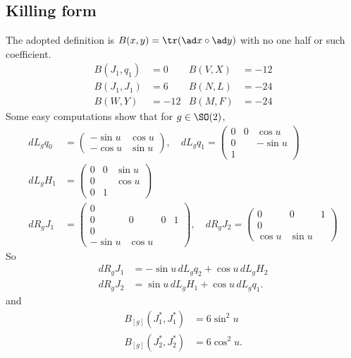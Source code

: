 \subsection{Killing form}
The adopted definition is $B(x,y)=\tr(\ad x\circ\ad y)$ with no one half or such coefficient.
\begin{equation}
	\begin{aligned}
		B(J_1,q_1) & =0   & B(V,X) & =-12 \\
		B(J_1,J_1) & =6   & B(N,L) & =-24 \\
		B(W,Y)     & =-12 & B(M,F) & =-24
	\end{aligned}
\end{equation}
Some easy computations show that for $g\in \SO(2)$,
\[
	\begin{split}
		dL_gq_0  & =
		\begin{pmatrix}
			-\sin u & \cos u \\
			-\cos u & \sin u
		\end{pmatrix},
		\quad
		dL_g q_1=
		\begin{pmatrix}
			0 & 0 & \cos u  \\
			0 &   & -\sin u \\
			1
		\end{pmatrix} \\
		dL_g H_1 & =
		\begin{pmatrix}
			0 & 0 & \sin u \\
			0 &   & \cos u \\
			0 & 1
		\end{pmatrix}  \\
		dR_g J_1 & =
		\begin{pmatrix}
			0                        \\
			0       & 0      & 0 & 1 \\
			0                        \\
			-\sin u & \cos u
		\end{pmatrix},
		\quad
		dR_g J_2=
		\begin{pmatrix}
			0      & 0      & 1 \\
			0                   \\
			\cos u & \sin u
		\end{pmatrix}
	\end{split}
\]
So
\begin{subequations}
	\begin{align}
		dR_g J_1 & =-\sin u\, dL_g q_2+\cos u\, dL_g H_2 \\
		dR_g J_2 & =\sin u\, dL_g H_1+\cos u\, dL_g q_1.
	\end{align}
\end{subequations}
and
\begin{subequations}
	\begin{align}
		B_{[g]}(J_1^*,J_1^*) & =6\sin^2 u  \\
		B_{[g]}(J_2^*,J_2^*) & =6\cos^2 u.
	\end{align}
\end{subequations}


